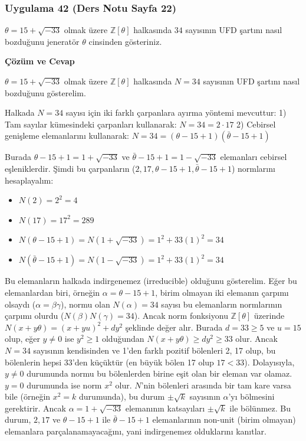 \documentclass[11pt, a4paper]{article}
\newenvironment{cozum}{
    \vspace{0.5cm}
    \noindent\textcolor{green!60!black}{\faCheckCircle\enspace \textbf{\Large Çözüm ve Cevap}}\par\vspace{0.2cm}
}{}
\begin{document}
\newpage
\subsubsection{Uygulama 42 (Ders Notu Sayfa 22)}
\begin{sorubox}
$\theta = 15 + \sqrt{-33}$ olmak üzere $\mathbb{Z}[\theta]$ halkasında $34$ sayısının UFD şartını nasıl bozduğunu jeneratör $\theta$ cinsinden gösteriniz.
\end{sorubox}
\begin{cozum}
$\theta = 15 + \sqrt{-33}$ olmak üzere $\mathbb{Z}[\theta]$ halkasında $N = 34$ sayısının UFD şartını nasıl bozduğunu gösterelim.

Halkada $N = 34$ sayısı için iki farklı çarpanlara ayırma yöntemi mevcuttur:
1) Tam sayılar kümesindeki çarpanları kullanarak: $N = 34 = 2 \cdot 17$
2) Cebirsel genişleme elemanlarını kullanarak: $N = 34 = (\theta - 15 + 1)(\bar{\theta} - 15 + 1)$

Burada $\theta - 15 + 1 = 1 + \sqrt{-33}$ ve $\bar{\theta} - 15 + 1 = 1 - \sqrt{-33}$ elemanları cebirsel eşleniklerdir. Şimdi bu çarpanların ($2, 17, \theta - 15 + 1, \bar{\theta} - 15 + 1$) normlarını hesaplayalım:
\begin{itemize}
    \item $N(2) = 2^2 = 4$
    \item $N(17) = 17^2 = 289$
    \item $N(\theta - 15 + 1) = N(1 + \sqrt{-33}) = 1^2 + 33(1)^2 = 34$
    \item $N(\bar{\theta} - 15 + 1) = N(1 - \sqrt{-33}) = 1^2 + 33(1)^2 = 34$
\end{itemize}

Bu elemanların halkada indirgenemez (irreducible) olduğunu gösterelim. Eğer bu elemanlardan biri, örneğin $\alpha = \theta - 15 + 1$, birim olmayan iki elemanın çarpımı olsaydı ($\alpha = \beta \gamma$), normu olan $N(\alpha) = 34$ sayısı bu elemanların normlarının çarpımı olurdu ($N(\beta)N(\gamma) = 34$). Ancak norm fonksiyonu $\mathbb{Z}[\theta]$ üzerinde $N(x+y\theta) = (x+yu)^2 + dy^2$ şeklinde değer alır. Burada $d = 33 \ge 5$ ve $u = 15$ olup, eğer $y \neq 0$ ise $y^2 \ge 1$ olduğundan $N(x+y\theta) \ge dy^2 \ge 33$ olur. Ancak $N = 34$ sayısının kendisinden ve 1'den farklı pozitif bölenleri 2, 17 olup, bu bölenlerin hepsi $33$'den küçüktür (en büyük bölen 17 olup $17 < 33$). Dolayısıyla, $y \neq 0$ durumunda normu bu bölenlerden birine eşit olan bir eleman var olamaz. $y = 0$ durumunda ise norm $x^2$ olur. $N$'nin bölenleri arasında bir tam kare varsa bile (örneğin $x^2 = k$ durumunda), bu durum $\pm \sqrt{k}$ sayısının $\alpha$'yı bölmesini gerektirir. Ancak $\alpha = 1+\sqrt{-33}$ elemanının katsayıları $\pm \sqrt{k}$ ile bölünmez. Bu durum, $2, 17$ ve $\theta - 15 + 1$ ile $\bar{\theta} - 15 + 1$ elemanlarının non-unit (birim olmayan) elemanlara parçalanamayacağını, yani indirgenemez olduklarını kanıtlar.


\end{cozum}
\end{document}

